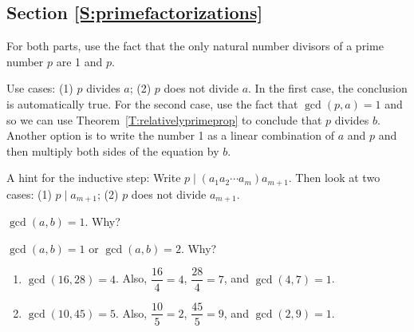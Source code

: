 \subsection*{Section \ref{S:primefactorizations}}

\begin{list}{\bf{\ref{exer:sec82-1}.}}
\item For both parts, use the fact that the only natural number divisors of a prime number $p$ are 1 and $p$.
\end{list}

\begin{list}{\bf{\ref{exer:sec82-2}.}}
\item Use cases: (1) $p$ divides $a$; (2) $p$ does not divide $a$.  In the first case, the conclusion is automatically true.  For the second case, use the fact that $\gcd ( p, a ) = 1$ and so we can use Theorem~\ref{T:relativelyprimeprop} to conclude that $p$ divides $b$.  Another option is to write the number 1 as a linear combination of $a$ and $p$ and then multiply both sides of the equation by $b$.
\end{list}

\begin{list}{\bf{\ref{exer:sec82-3}.}}
\item A hint for the inductive step: Write  $p \mid ( {a_1 a_2  \cdots a_m } )a_{m + 1} $.  Then look at two cases:  (1) $p \mid a_{m + 1} $; (2) $p$  does not divide  $a_{m + 1} $.
\end{list}

\begin{list}{\bf{\ref{exer:lincombequalone}.}}
\item \begin{list}{\bf{(a)}}
\item $\gcd ( a, b ) = 1$.  Why?
\end{list}
\end{list}

\begin{list}{}
\item \begin{list}{(\bf{b)}}
\item $\gcd ( a, b ) = 1$ or $\gcd ( a, b ) = 2$.  Why?
\end{list}
\end{list}

\begin{list}{\bf{\ref{exer:dividebygcd}.}}
\item \begin{enumerate}
\item $\gcd \left( 16, 28 \right) = 4$.  Also, $\dfrac{16}{4} = 4$, $\dfrac{28}{4} = 7$, and 
$\gcd \left( 4, 7 \right) = 1$.

\item $\gcd \left( 10, 45 \right) = 5$.  Also, $\dfrac{10}{5} = 2$, $\dfrac{45}{5} = 9$, and 
$\gcd \left( 2, 9 \right) = 1$.
\end{enumerate}
\end{list}


